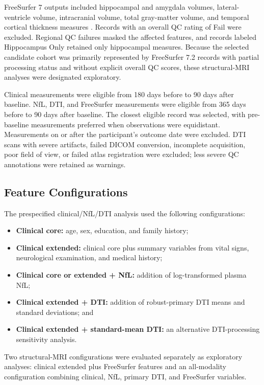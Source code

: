 \documentclass[preprint,12pt]{elsarticle}
\begin{document}
FreeSurfer 7 outputs included hippocampal and amygdala volumes, lateral-ventricle volume, intracranial volume, total gray-matter volume, and temporal cortical thickness measures \cite{fischlFreeSurfer2012}. Records with an overall QC rating of Fail were excluded. Regional QC failures masked the affected features, and records labeled Hippocampus Only retained only hippocampal measures. Because the selected candidate cohort was primarily represented by FreeSurfer 7.2 records with partial processing status and without explicit overall QC scores, these structural-MRI analyses were designated exploratory.

Clinical measurements were eligible from 180 days before to 90 days after baseline. NfL, DTI, and FreeSurfer measurements were eligible from 365 days before to 90 days after baseline. The closest eligible record was selected, with pre-baseline measurements preferred when observations were equidistant. Measurements on or after the participant's outcome date were excluded. DTI scans with severe artifacts, failed DICOM conversion, incomplete acquisition, poor field of view, or failed atlas registration were excluded; less severe QC annotations were retained as warnings.

\subsection{Feature Configurations}

The prespecified clinical/NfL/DTI analysis used the following configurations:

\begin{itemize}
    \item \textbf{Clinical core:} age, sex, education, and family history;
    \item \textbf{Clinical extended:} clinical core plus summary variables from vital signs, neurological examination, and medical history;
    \item \textbf{Clinical core or extended + NfL:} addition of log-transformed plasma NfL;
    \item \textbf{Clinical extended + DTI:} addition of robust-primary DTI means and standard deviations; and
    \item \textbf{Clinical extended + standard-mean DTI:} an alternative DTI-processing sensitivity analysis.
\end{itemize}

Two structural-MRI configurations were evaluated separately as exploratory analyses: clinical extended plus FreeSurfer features and an all-modality configuration combining clinical, NfL, primary DTI, and FreeSurfer variables.
\end{document}
